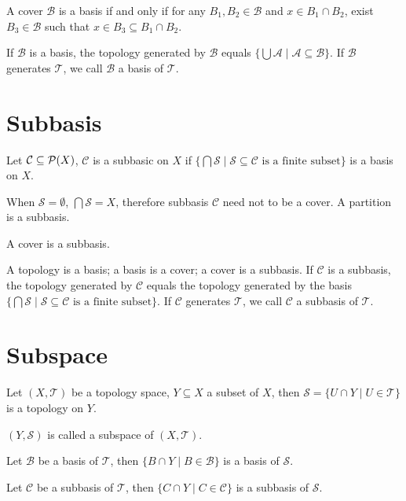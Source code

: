\begin{pro}
A cover $\mathcal{B}$ is a basis if and only if
for any $B_1, B_2 \in \mathcal{B}$ and $x \in B_1 \cap B_2$,
exist $B_3 \in \mathcal{B}$ such that $x \in B_3 \subseteq B_1 \cap B_2$.
\end{pro}
If $\mathcal{B}$ is a basis, the topology generated by $\mathcal{B}$
equals $\{\bigcup \mathcal{A} \mid \mathcal{A} \subseteq \mathcal{B}\}$.
If $\mathcal{B}$ generates $\mathcal{T}$, we call $\mathcal{B}$ a basis of $\mathcal{T}$.

\section{Subbasis}
\begin{defi}
Let $\mathcal{C} \subseteq \mathcal{P}(X)$, $\mathcal{C}$ is a subbasic on $X$
if $\{\bigcap \mathcal{S} \mid \mathcal{S} \subseteq \mathcal{C}\mbox{ is a finite subset}\}$
is a basis on $X$.
\end{defi}
When $\mathcal{S} = \emptyset$, $\bigcap \mathcal{S} = X$,
therefore subbasis $\mathcal{C}$ need not to be a cover.
A partition is a subbasis.

\begin{pro}
A cover is a subbasis.
\end{pro}
A topology is a basis; a basis is a cover; a cover is a subbasis.
If $\mathcal{C}$ is a subbasis, the topology generated by $\mathcal{C}$
equals the topology generated by the basis
$\{\bigcap \mathcal{S} \mid \mathcal{S} \subseteq \mathcal{C}\mbox{ is a finite subset}\}$.
If $\mathcal{C}$ generates $\mathcal{T}$, we call $\mathcal{C}$ a subbasis of $\mathcal{T}$.

\section{Subspace}
\begin{pro}
Let $(X, \mathcal{T})$ be a topology space, $Y \subseteq X$ a subset of $X$,
then $\mathcal{S} = \{U \cap Y \mid U \in \mathcal{T}\}$ is a topology on $Y$.
\end{pro}
$(Y, \mathcal{S})$ is called a subspace of $(X, \mathcal{T})$.

\begin{pro}
Let $\mathcal{B}$ be a basis of $\mathcal{T}$,
then $\{B \cap Y \mid B \in \mathcal{B}\}$ is a basis of $\mathcal{S}$.
\end{pro}
\begin{pro}
Let $\mathcal{C}$ be a subbasis of $\mathcal{T}$,
then $\{C \cap Y \mid C \in \mathcal{C}\}$ is a subbasis of $\mathcal{S}$.
\end{pro}

